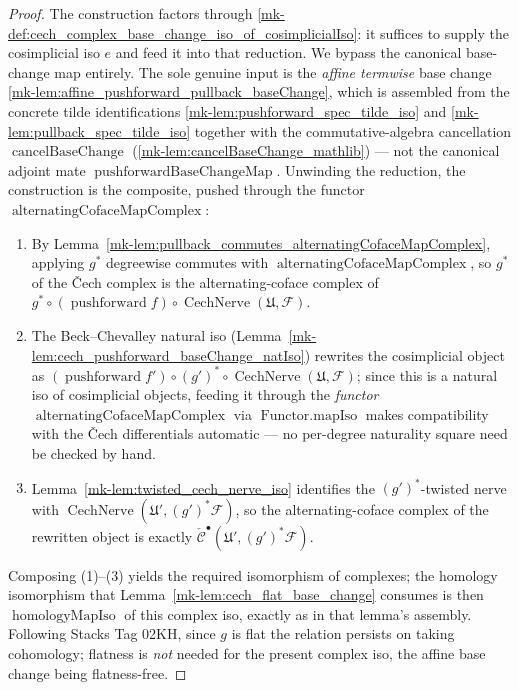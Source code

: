 \begin{proof}
  The construction factors through
  \ref{mk-def:cech_complex_base_change_iso_of_cosimplicialIso}: it suffices to supply the
  cosimplicial iso \(e\) and feed it into that reduction. We bypass the canonical
  base-change map entirely. The sole genuine input is the \emph{affine termwise} base
  change \ref{mk-lem:affine_pushforward_pullback_baseChange}, which is assembled from the
  concrete tilde identifications \ref{mk-lem:pushforward_spec_tilde_iso} and
  \ref{mk-lem:pullback_spec_tilde_iso} together with the commutative-algebra cancellation
  \(\operatorname{cancelBaseChange}\) (\ref{mk-lem:cancelBaseChange_mathlib}) --- not the
  canonical adjoint mate \(\operatorname{pushforwardBaseChangeMap}\). Unwinding the
  reduction, the construction is the composite,
  pushed through the functor \(\operatorname{alternatingCofaceMapComplex}\):
  \begin{enumerate}
    \item By Lemma~\ref{mk-lem:pullback_commutes_alternatingCofaceMapComplex}, applying
      \(g^*\) degreewise commutes with \(\operatorname{alternatingCofaceMapComplex}\),
      so \(g^*\) of the {\v C}ech complex is the alternating-coface complex of
      \(g^* \circ (\operatorname{pushforward} f) \circ
      \operatorname{CechNerve}(\mathfrak{U}, \mathcal{F})\).
    \item The Beck--Chevalley natural iso
      (Lemma~\ref{mk-lem:cech_pushforward_baseChange_natIso}) rewrites the cosimplicial
      object as \((\operatorname{pushforward} f') \circ (g')^* \circ
      \operatorname{CechNerve}(\mathfrak{U}, \mathcal{F})\); since this is a natural iso
      of cosimplicial objects, feeding it through the \emph{functor}
      \(\operatorname{alternatingCofaceMapComplex}\) via \(\operatorname{Functor.mapIso}\)
      makes compatibility with the {\v C}ech differentials automatic --- no per-degree
      naturality square need be checked by hand.
    \item Lemma~\ref{mk-lem:twisted_cech_nerve_iso} identifies the \((g')^*\)-twisted nerve
      with \(\operatorname{CechNerve}(\mathfrak{U}', (g')^*\mathcal{F})\), so the
      alternating-coface complex of the rewritten object is exactly
      \(\check{\mathcal{C}}^\bullet(\mathfrak{U}', (g')^*\mathcal{F})\).
  \end{enumerate}
  Composing (1)--(3) yields the required isomorphism of complexes; the homology
  isomorphism that Lemma~\ref{mk-lem:cech_flat_base_change} consumes is then
  \(\operatorname{homologyMapIso}\) of this complex iso, exactly as in that lemma's
  assembly. Following Stacks Tag 02KH, since \(g\) is flat the relation persists on
  taking cohomology; flatness is \emph{not} needed for the present complex iso, the
  affine base change being flatness-free.
\end{proof}
